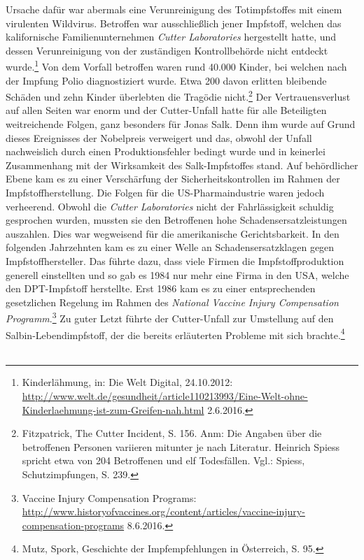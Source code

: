 \documentclass[
    a4paper,
    12pt,
    hyphens,
    chapterprefix=true,
    headheight=33pt,
    footheight=29pt,
    headings=optiontohead, %
]{scrartcl}
\begin{document}
Ursache dafür war abermals eine Verunreinigung des Totimpfstoffes mit einem virulenten Wildvirus. Betroffen war ausschließlich jener Impfstoff, welchen das kalifornische Familienunternehmen \textit{Cutter Laboratories} hergestellt hatte, und dessen Verunreinigung von der zuständigen Kontrollbehörde nicht entdeckt wurde.\footnote{Kinderlähmung, in: Die Welt Digital, 
24.10.2012: \url{http://www.welt.de/gesundheit/article110213993/Eine-Welt-ohne-Kinderlaehmung-ist-zum-Greifen-nah.html} 2.6.2016.} 
Von dem Vorfall betroffen waren rund 40.000 Kinder, bei welchen nach der Impfung Polio diagnostiziert wurde. Etwa 200 
davon erlitten bleibende Schäden und zehn Kinder überlebten die Tragödie nicht.\footnote{Fitzpatrick, The Cutter Incident, S. 156. Anm: Die Angaben über die betroffenen Personen variieren mitunter je nach Literatur. Heinrich Spiess spricht etwa von 204 Betroffenen und elf Todesfällen. Vgl.: Spiess, Schutzimpfungen, S. 239.} 
Der Vertrauensverlust auf allen Seiten war enorm und der Cutter-Unfall hatte für alle Beteiligten weitreichende Folgen, 
ganz besonders für Jonas Salk. Denn ihm wurde auf Grund dieses Ereignisses der Nobelpreis verweigert und das, obwohl der Unfall 
nachweislich durch einen Produktionsfehler bedingt wurde und in keinerlei Zusammenhang mit der Wirksamkeit des Salk-Impfstoffes stand. 
Auf behördlicher Ebene kam es zu einer Verschärfung der Sicherheitskontrollen im Rahmen der Impfstoffherstellung. 
Die Folgen für die US-Pharmaindustrie waren jedoch verheerend. Obwohl die \textit{Cutter Laboratories} nicht der Fahrlässigkeit 
schuldig gesprochen wurden, mussten sie den Betroffenen hohe Schadensersatzleistungen auszahlen. Dies war wegweisend für die amerikanische Gerichtsbarkeit. In den folgenden Jahrzehnten kam es zu einer Welle an Schadensersatzklagen gegen Impfstoffhersteller. 
Das führte dazu, dass viele Firmen die Impfstoffproduktion generell einstellten und so gab es 1984 nur mehr eine Firma in den USA, welche den DPT-Impfstoff herstellte. Erst 1986 kam es zu einer entsprechenden gesetzlichen Regelung im Rahmen des 
\textit{National Vaccine Injury Compensation Programm}.\footnote{Vaccine Injury Compensation Programs: \url{http://www.historyofvaccines.org/content/articles/vaccine-injury-compensation-programs} 8.6.2016.} 
Zu guter Letzt führte der Cutter-Unfall zur Umstellung auf den Salbin-Lebendimpfstoff, der die bereits erläuterten Probleme 
mit sich brachte.\footnote{Mutz, Spork, Geschichte der Impfempfehlungen in Österreich, S. 95.}\\
\\
\end{document}
